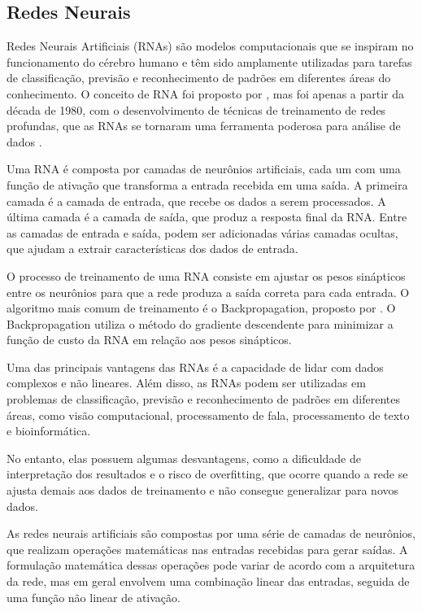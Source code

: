 \subsection{Redes Neurais}



Redes Neurais Artificiais (RNAs) são modelos computacionais que se inspiram no funcionamento do cérebro humano e têm sido amplamente utilizadas para tarefas de classificação, previsão e reconhecimento de padrões em diferentes áreas do conhecimento. O conceito de RNA foi proposto por \cite{mcculloch1943logical}, mas foi apenas a partir da década de 1980, com o desenvolvimento de técnicas de treinamento de redes profundas, que as RNAs se tornaram uma ferramenta poderosa para análise de dados \cite{lecun2015deep}.

Uma RNA é composta por camadas de neurônios artificiais, cada um com uma função de ativação que transforma a entrada recebida em uma saída. A primeira camada é a camada de entrada, que recebe os dados a serem processados. A última camada é a camada de saída, que produz a resposta final da RNA. Entre as camadas de entrada e saída, podem ser adicionadas várias camadas ocultas, que ajudam a extrair características dos dados de entrada.

O processo de treinamento de uma RNA consiste em ajustar os pesos sinápticos entre os neurônios para que a rede produza a saída correta para cada entrada. O algoritmo mais comum de treinamento é o Backpropagation, proposto por \cite{rumelhart1986parallel}. O Backpropagation utiliza o método do gradiente descendente para minimizar a função de custo da RNA em relação aos pesos sinápticos.

Uma das principais vantagens das RNAs é a capacidade de lidar com dados complexos e não lineares. Além disso, as RNAs podem ser utilizadas em problemas de classificação, previsão e reconhecimento de padrões em diferentes áreas, como visão computacional, processamento de fala, processamento de texto e bioinformática.

No entanto, elas possuem algumas desvantagens, como a dificuldade de interpretação dos resultados e o risco de overfitting, que ocorre quando a rede se ajusta demais aos dados de treinamento e não consegue generalizar para novos dados.

As redes neurais artificiais são compostas por uma série de camadas de neurônios, que realizam operações matemáticas nas entradas recebidas para gerar saídas. A formulação matemática dessas operações pode variar de acordo com a arquitetura da rede, mas em geral envolvem uma combinação linear das entradas, seguida de uma função não linear de ativação.


